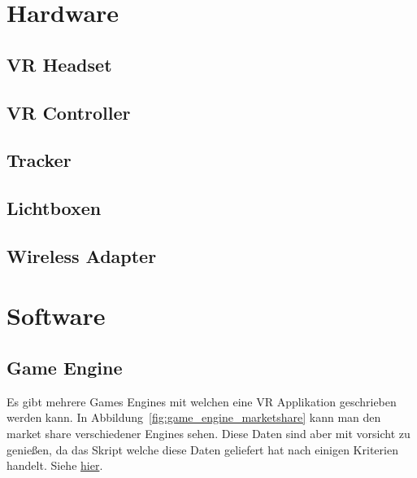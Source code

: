 \section{Hardware}
\lipsum[5-12]

\subsection{VR Headset}
\lipsum[5-12]

\subsection{VR Controller}
\lipsum[5-12]

\subsection{Tracker}
\lipsum[5-12]

\subsection{Lichtboxen}\label{sec:lighthouse}
\lipsum[5-12]

\subsection{Wireless Adapter }
\lipsum[5-12]

\section{Software}

\subsection{Game Engine}

Es gibt mehrere Games Engines mit welchen eine VR Applikation geschrieben werden kann.
In Abbildung~\ref{fig:game_engine_marketshare} kann man den market share verschiedener Engines sehen.
Diese Daten sind aber mit vorsicht zu genießen, da das Skript welche diese Daten geliefert hat nach einigen Kriterien handelt.
Siehe \href{https://www.reddit.com/r/gamedev/comments/8s20qp/i_researched_the_market_share_of_game_engines_on/}{hier}.

